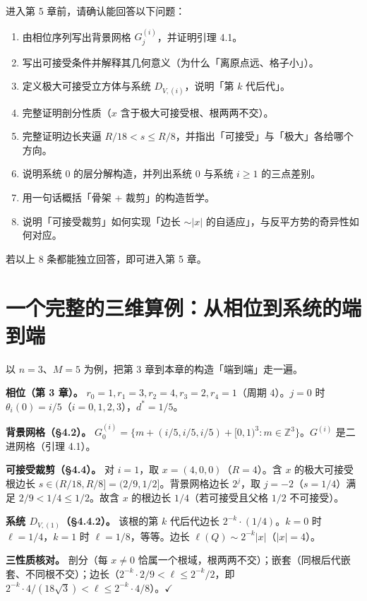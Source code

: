 \documentclass[a4paper,11pt,openany]{ctexbook}
\numberwithin{equation}{chapter}
\numberwithin{figure}{chapter}
\numberwithin{table}{chapter}
\begin{document}
进入第 5 章前，请确认能回答以下问题：

\begin{enumerate}
\item 由相位序列写出背景网格 $G_j^{(i)}$，并证明引理 4.1。
\item 写出可接受条件并解释其几何意义（为什么「离原点远、格子小」）。
\item 定义极大可接受立方体与系统 $D_{V,(i)}$，说明「第 $k$ 代后代」。
\item 完整证明剖分性质（$x$ 含于极大可接受根、根两两不交）。
\item 完整证明边长夹逼 $R/18<s\le R/8$，并指出「可接受」与「极大」各给哪个方向。
\item 说明系统 0 的层分解构造，并列出系统 0 与系统 $i\ge1$ 的三点差别。
\item 用一句话概括「骨架 + 裁剪」的构造哲学。
\item 说明「可接受裁剪」如何实现「边长 $\sim|x|$ 的自适应」，与反平方势的奇异性如何对应。
\end{enumerate}

若以上 8 条都能独立回答，即可进入第 5 章。

\section{一个完整的三维算例：从相位到系统的端到端}

以 $n=3$、$M=5$ 为例，把第 3 章到本章的构造「端到端」走一遍。

\textbf{相位（第 3 章）。} $r_0=1,r_1=3,r_2=4,r_3=2,r_4=1$（周期 $4$）。$j=0$ 时 $\theta_i(0)=i/5$（$i=0,1,2,3$），$d^*=1/5$。

\textbf{背景网格（§4.2）。} $G_0^{(i)}=\{m+(i/5,i/5,i/5)+[0,1)^3:m\in\mathbb Z^3\}$。$G^{(i)}$ 是二进网格（引理 4.1）。

\textbf{可接受裁剪（§4.4）。} 对 $i=1$，取 $x=(4,0,0)$（$R=4$）。含 $x$ 的极大可接受根边长 $s\in(R/18,R/8]=(2/9,1/2]$。背景网格边长 $2^j$，取 $j=-2$（$s=1/4$）满足 $2/9<1/4\le1/2$。故含 $x$ 的根边长 $1/4$（若可接受且父格 $1/2$ 不可接受）。

\textbf{系统 $D_{V,(1)}$（§4.4.2）。} 该根的第 $k$ 代后代边长 $2^{-k}\cdot(1/4)$。$k=0$ 时 $\ell=1/4$，$k=1$ 时 $\ell=1/8$，等等。边长 $\ell(Q)\sim2^{-k}|x|$（$|x|=4$）。

\textbf{三性质核对。} 剖分（每 $x\neq0$ 恰属一个根域，根两两不交）；嵌套（同根后代嵌套、不同根不交）；边长（$2^{-k}\cdot2/9<\ell\le2^{-k}/2$，即 $2^{-k}\cdot4/(18\sqrt3)<\ell\le2^{-k}\cdot4/8$）。$\checkmark$
\end{document}

